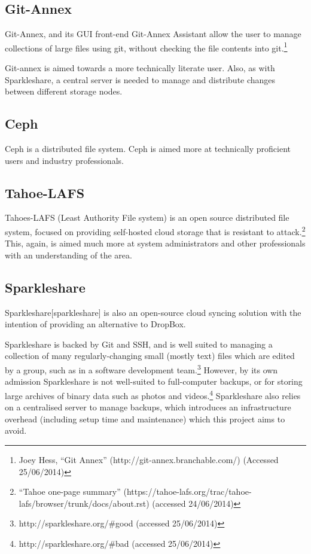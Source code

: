 \documentclass[12pt,a4paper,]{adreport}
\begin{document}
\subsection{Git-Annex}\label{git-annex}

Git-Annex, and its GUI front-end Git-Annex Assistant allow the user to
manage collections of large files using git, without checking the file
contents into git.\footnote{Joey Hess, ``Git Annex''
  (http://git-annex.branchable.com/) (Accessed 25/06/2014)}

Git-annex is aimed towards a more technically literate user. Also, as
with Sparkleshare, a central server is needed to manage and distribute
changes between different storage nodes.

\subsection{Ceph}\label{ceph}

Ceph is a distributed file system. Ceph is aimed more at technically
proficient users and industry professionals.

\subsection{Tahoe-LAFS}\label{tahoe-lafs}

Tahoes-LAFS (Least Authority File system) is an open source distributed
file system, focused on providing self-hosted cloud storage that is
resistant to attack.\footnote{``Tahoe one-page summary''
  (https://tahoe-lafs.org/trac/tahoe-lafs/browser/trunk/docs/about.rst)
  (accessed 24/06/2014)} This, again, is aimed much more at system
administrators and other professionals with an understanding of the
area.

\subsection{Sparkleshare}\label{sparkleshare}

Sparkleshare{[}sparkleshare{]} is also an open-source cloud syncing
solution with the intention of providing an alternative to DropBox.

Sparkleshare is backed by Git and SSH, and is well suited to managing a
collection of many regularly-changing small (mostly text) files which
are edited by a group, such as in a software development team.\footnote{http://sparkleshare.org/\#good
  (accessed 25/06/2014)} However, by its own admission Sparkleshare is
not well-suited to full-computer backups, or for storing large archives
of binary data such as photos and videos.\footnote{http://sparkleshare.org/\#bad
  (accessed 25/06/2014)} Sparkleshare also relies on a centralised
server to manage backups, which introduces an infrastructure overhead
(including setup time and maintenance) which this project aims to avoid.
\end{document}
